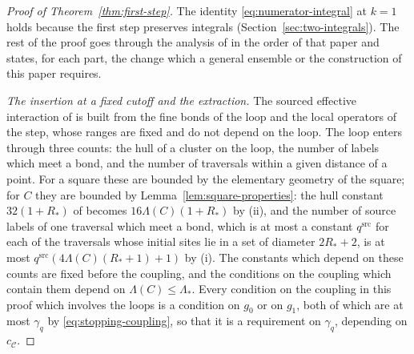 \documentclass[11pt]{preprint}
\numberwithin{equation}{section}
\theoremstyle{definition}
\theoremstyle{remark}
\theoremstyle{plain}
\begin{document}
\begin{proof}[Proof of Theorem~\ref{thm:first-step}]
The identity \eqref{eq:numerator-integral} at $k = 1$ holds because the first step preserves integrals (Section~\ref{sec:two-integrals}). The rest of the proof goes through the analysis of \cite{WilsonFirstStep} in the order of that paper and states, for each part, the change which a general ensemble or the construction of this paper requires.

\emph{The insertion at a fixed cutoff and the extraction.} The sourced effective interaction of \cite[Sections~2--3]{WilsonFirstStep} is built from the fine bonds of the loop and the local operators of the step, whose ranges are fixed and do not depend on the loop. The loop enters through three counts: the hull of a cluster on the loop, the number of labels which meet a bond, and the number of traversals within a given distance of a point. For a square these are bounded by the elementary geometry of the square; for $C$ they are bounded by Lemma~\ref{lem:square-properties}: the hull constant $32(1 + R_*)$ of \cite[(5.24)]{WilsonFirstStep} becomes $16\Lambda(C)(1 + R_*)$ by (ii), and the number of source labels of one traversal which meet a bond, which is at most a constant $q^{\mathrm{src}}$ for each of the traversals whose initial sites lie in a set of diameter $2R_* + 2$, is at most $q^{\mathrm{src}}(4\Lambda(C)(R_* + 1) + 1)$ by (i). The constants which depend on these counts are fixed before the coupling, and the conditions on the coupling which contain them depend on $\Lambda(C) \leq \Lambda_*$. Every condition on the coupling in this proof which involves the loops is a condition on $g_0$ or on $g_1$, both of which are at most $\gamma_q$ by \eqref{eq:stopping-coupling}, so that it is a requirement on $\gamma_q$, depending on $c_{\mathcal C}$.


\end{proof}
\end{document}
